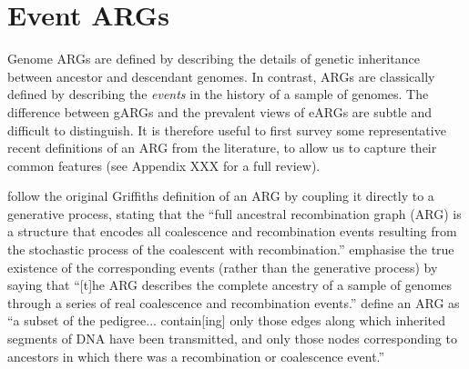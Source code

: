 \documentclass{article}
\begin{document}
\section*{Event ARGs}\label{eARG}
Genome ARGs are defined by
describing the details of genetic inheritance
between ancestor and descendant genomes.
In contrast, ARGs are classically defined
by describing the \emph{events} in the history of a sample of genomes.
The difference between gARGs and the prevalent views of eARGs
are subtle and difficult to distinguish.
It is therefore useful to first survey some representative
recent definitions of
an ARG from the literature, to allow us to capture their common features
(see Appendix XXX for a full review).

\citet{brandt2021evaluation} follow the original Griffiths definition of
an ARG by coupling it directly to a generative process, stating
that the ``full ancestral recombination graph (ARG) is a structure that encodes all
coalescence and recombination events resulting from the stochastic process of
the coalescent with recombination.''
\citet{shipilina2023origin} emphasise the true existence of the
corresponding events (rather than the generative process) by saying that
``[t]he ARG describes the complete
ancestry of a sample of genomes through a series of real coalescence and
recombination events.''
\cite{mathieson2020ancestry}
define an ARG as ``a subset of the pedigree...
contain[ing] only those edges along which inherited segments of DNA have been
transmitted, and only those nodes corresponding to ancestors in which there was
a recombination or coalescence event.''
\end{document}
